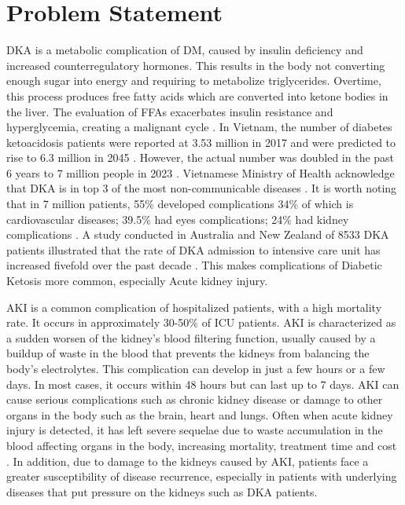 \documentclass[../main.tex]{subfiles}
\begin{document}
\section{Problem Statement}
\label{sec:dvd}

\gls{DKA} is a metabolic complication of \gls{DM}, caused by insulin deficiency and increased counterregulatory hormones.
This results in the body not converting enough sugar into energy and requiring to metabolize triglycerides.
Overtime, this process produces free fatty acids which are converted into ketone bodies in the liver.
The evaluation of FFAs exacerbates insulin resistance and hyperglycemia, creating a malignant cycle \cite{dka-info}.
In Vietnam, the number of diabetes ketoacidosis patients were reported at 3.53 million in 2017 \cite{vn-dka-3.5-2019} and were predicted to rise to 6.3 million in 2045 \cite{vn-dka-predict-6.3-2045}.
However, the actual number was doubled in the past 6 years to 7 million people in 2023 \cite{vn-dka-7-2023}.
Vietnamese Ministry of Health acknowledge that \gls{DKA} is in top 3 of the most non-communicable diseases \cite{vn-dka-predict-6.3-2045}.
It is worth noting that in 7 million patients, 55\% developed complications 34\% of which is cardiovascular diseases; 39.5\% had eyes complications; 24\% had kidney complications \cite{vn-dka-7-2023}.
A study conducted in Australia and New Zealand of 8533 \gls{DKA} patients illustrated that the rate of \gls{DKA} admission to intensive care unit has increased fivefold over the past decade \cite{aus+nz-dka-icu-increase}.
This makes complications of Diabetic Ketosis more common, especially Acute kidney injury.

\gls{AKI} is a common complication of hospitalized patients, with a high mortality rate.
It occurs in approximately 30-50\% of \gls{ICU} patients.
AKI is characterized as a sudden worsen of the kidney's blood filtering function, usually caused by a buildup of waste in the blood that prevents the kidneys from balancing the body's electrolytes.
This complication can develop in just a few hours or a few days.
In most cases, it occurs within 48 hours but can last up to 7 days.
AKI can cause serious complications such as chronic kidney disease or damage to other organs in the body such as the brain, heart and lungs.
Often when acute kidney injury is detected, it has left severe sequelae due to waste accumulation in the blood affecting organs in the body, increasing mortality, treatment time and cost \cite{kdigo-aki-guideline}.
In addition, due to damage to the kidneys caused by AKI, patients face a greater susceptibility of disease recurrence, especially in patients with underlying diseases that put pressure on the kidneys such as \gls{DKA} patients.
\end{document}

